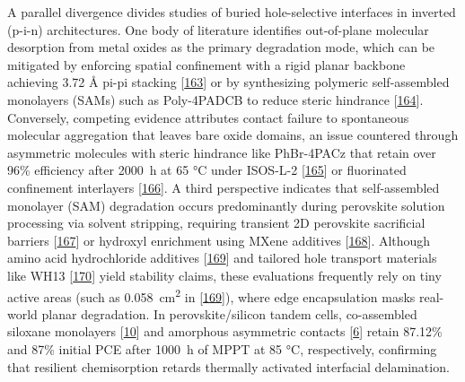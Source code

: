 \documentclass[
  11pt,
]{article}
\begin{document}
A parallel divergence divides studies of buried hole-selective
interfaces in inverted (p-i-n) architectures. One body of literature
identifies out-of-plane molecular desorption from metal oxides as the
primary degradation mode, which can be mitigated by enforcing spatial
confinement with a rigid planar backbone achieving 3.72 Å pi-pi stacking
{[}\href{https://doi.org/10.1016/j.scib.2026.02.050}{163}{]} or by
synthesizing polymeric self-assembled monolayers (SAMs) such as
Poly-4PADCB to reduce steric hindrance
{[}\href{https://doi.org/10.1002/adma.72622}{164}{]}. Conversely,
competing evidence attributes contact failure to spontaneous molecular
aggregation that leaves bare oxide domains, an issue countered through
asymmetric molecules with steric hindrance like PhBr-4PACz that retain
over 96\% efficiency after \qty{2000}{\hour} at 65 °C under ISOS-L-2
{[}\href{https://doi.org/10.1038/s41467-026-72097-1}{165}{]} or
fluorinated confinement interlayers
{[}\href{https://doi.org/10.1038/s41467-026-72115-2}{166}{]}. A third
perspective indicates that self-assembled monolayer (SAM) degradation
occurs predominantly during perovskite solution processing via solvent
stripping, requiring transient 2D perovskite sacrificial barriers
{[}\href{https://doi.org/10.1002/adma.73561}{167}{]} or hydroxyl
enrichment using MXene additives
{[}\href{https://doi.org/10.1002/adma.73656}{168}{]}. Although amino
acid hydrochloride additives
{[}\href{https://doi.org/10.1002/aenm.70925}{169}{]} and tailored hole
transport materials like WH13
{[}\href{https://doi.org/10.1002/anie.202523665}{170}{]} yield stability
claims, these evaluations frequently rely on tiny active areas (such as
\qty{0.058}{\centi\meter\squared} in
{[}\href{https://doi.org/10.1002/aenm.70925}{169}{]}), where edge
encapsulation masks real-world planar degradation. In perovskite/silicon
tandem cells, co-assembled siloxane monolayers
{[}\href{https://doi.org/10.1002/aenm.71107}{10}{]} and amorphous
asymmetric contacts {[}\href{https://doi.org/10.1002/adma.73106}{6}{]}
retain 87.12\% and 87\% initial PCE after \qty{1000}{\hour} of MPPT at
85 °C, respectively, confirming that resilient chemisorption retards
thermally activated interfacial delamination.
\end{document}
